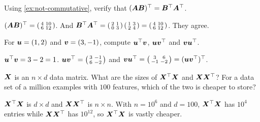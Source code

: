 \begin{exercise}
Using \cref{ex:not-commutative}, verify that $(\bm{A}\bm{B})^\top = \bm{B}^\top\bm{A}^\top$.
\end{exercise}
\begin{solution}
$(\bm{A}\bm{B})^\top = \left(\begin{smallmatrix} 4 & 10\\ 6 & 12\end{smallmatrix}\right)$.
And $\bm{B}^\top\bm{A}^\top = \left(\begin{smallmatrix} 2 & 1\\ 0 &
3\end{smallmatrix}\right)\left(\begin{smallmatrix} 1 & 3\\ 2 &
4\end{smallmatrix}\right) = \left(\begin{smallmatrix} 4 & 10\\ 6 &
12\end{smallmatrix}\right)$. They agree.
\end{solution}

\begin{exercise}
For $\bm{u} = (1, 2)$ and $\bm{v} = (3, -1)$, compute $\bm{u}^\top\bm{v}$, $\bm{u}\bm{v}^\top$
and $\bm{v}\bm{u}^\top$.
\end{exercise}
\begin{solution}
$\bm{u}^\top\bm{v} = 3 - 2 = 1$. $\bm{u}\bm{v}^\top = \left(\begin{smallmatrix} 3 & -1\\ 6 &
-2\end{smallmatrix}\right)$ and $\bm{v}\bm{u}^\top = \left(\begin{smallmatrix} 3 & 6\\
-1 & -2\end{smallmatrix}\right) = (\bm{u}\bm{v}^\top)^\top$.
\end{solution}

\begin{exercise}
$\bm{X}$ is an $n\times d$ data matrix. What are the sizes of $\bm{X}^\top\bm{X}$ and
$\bm{X}\bm{X}^\top$? For a data set of a million examples with $100$ features, which
of the two is cheaper to store?
\end{exercise}
\begin{solution}
$\bm{X}^\top\bm{X}$ is $d\times d$ and $\bm{X}\bm{X}^\top$ is $n\times n$. With
$n = 10^6$ and $d = 100$, $\bm{X}^\top\bm{X}$ has $10^4$ entries while $\bm{X}\bm{X}^\top$
has $10^{12}$, so $\bm{X}^\top\bm{X}$ is vastly cheaper.
\end{solution}


